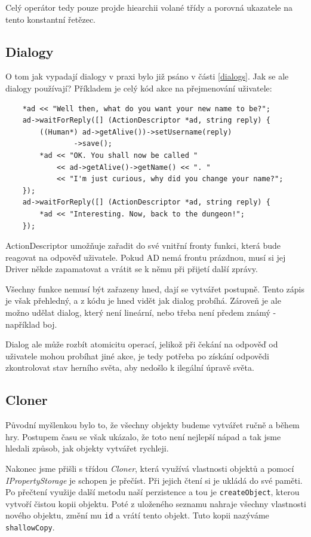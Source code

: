 \documentclass[11pt, a4paper]{article}
\def\class#1{\emph{#1}}
\begin{document}
\noindent Celý operátor tedy pouze projde hiearchii volané třídy a porovná ukazatele na tento konstantní řetězec.

\subsection{Dialogy}

O tom jak vypadají dialogy v praxi bylo již psáno v části \ref{dialogs}. Jak se ale dialogy používají? Příkladem je celý kód akce na přejmenování uživatele:

\begin{lstlisting}
	*ad << "Well then, what do you want your new name to be?";
	ad->waitForReply([] (ActionDescriptor *ad, string reply) {
		((Human*) ad->getAlive())->setUsername(reply)
				->save();
		*ad << "OK. You shall now be called " 
			<< ad->getAlive()->getName() << ". "
		    << "I'm just curious, why did you change your name?";
	});
	ad->waitForReply([] (ActionDescriptor *ad, string reply) {
		*ad << "Interesting. Now, back to the dungeon!";
	});
\end{lstlisting}

\noindent ActionDescriptor umožňuje zařadit do své vnitřní fronty funkci, která bude reagovat na odpověď uživatele. Pokud AD nemá frontu prázdnou, musí si jej Driver někde zapamatovat a vrátit se k němu při přijetí další zprávy.

Všechny funkce nemusí být zařazeny hned, dají se vytvářet postupně. Tento zápis je však přehledný, a z kódu je hned vidět jak dialog probíhá. Zároveň je ale možno udělat dialog, který není lineární, nebo třeba není předem známý - například boj.

Dialog ale může rozbít atomicitu operací, jelikož při čekání na odpověď od uživatele mohou probíhat jiné akce, je tedy potřeba po získání odpovědi zkontrolovat stav herního světa, aby nedošlo k ilegální úpravě světa.

\subsection{Cloner}

Původní myšlenkou bylo to, že všechny objekty budeme vytvářet ručně a během hry. Postupem času se však ukázalo, že toto není nejlepší nápad a tak jsme hledali způsob, jak objekty vytvářet rychleji.

Nakonec jsme přišli s třídou \class{Cloner}, která využívá vlastnosti objektů a pomocí \class{IPropertyStorage} je schopen je přečíst. Při jejich čtení si je ukládá do své paměti. Po přečtení využije další metodu naší perzistence a tou je \texttt{createObject}, kterou vytvoří čistou kopii objektu. Poté z uloženého seznamu nahraje všechny vlastnosti nového objektu, změní mu \texttt{id} a vrátí tento objekt. Tuto kopii nazýváme \texttt{shallowCopy}.
\end{document}
